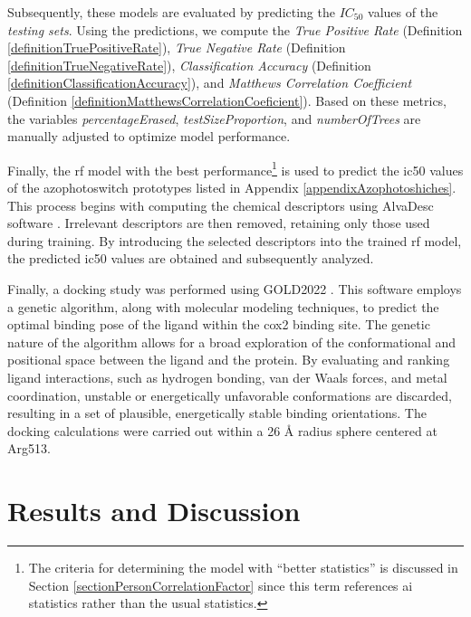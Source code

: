 \documentclass[11pt]{article}
\begin{document}
Subsequently, these models are evaluated by predicting the $IC_{50}$ values of the \emph{testing sets}. Using the predictions, we compute the \emph{True Positive Rate} (Definition \ref{definitionTruePositiveRate}), \emph{True Negative Rate} (Definition \ref{definitionTrueNegativeRate}), \emph{Classification Accuracy} (Definition \ref{definitionClassificationAccuracy}), and \emph{Matthews Correlation Coefficient} (Definition \ref{definitionMatthewsCorrelationCoeficient}). Based on these metrics, the variables \emph{percentageErased}, \emph{testSizeProportion}, and \emph{numberOfTrees} are manually adjusted to optimize model performance.

Finally, the \gls{rf} model with the best performance\footnote{The criteria for determining the model with “better statistics” is discussed in Section \ref{sectionPersonCorrelationFactor} since this term references \gls{ai} statistics rather than the usual statistics.} is used to predict the \gls{ic50} values of the azophotoswitch prototypes listed in Appendix \ref{appendixAzophotoshiches}. This process begins with computing the chemical descriptors using AlvaDesc software \cite{MauriMolecularDescriptorsBook}. Irrelevant descriptors are then removed, retaining only those used during training. By introducing the selected descriptors into the trained \gls{rf} model, the predicted \gls{ic50} values are obtained and subsequently analyzed.

Finally, a docking study was performed using GOLD2022 \cite{GoldReference}. This software employs a genetic algorithm, along with molecular modeling techniques, to predict the optimal binding pose of the ligand within the \gls{cox2} binding site. The genetic nature of the algorithm allows for a broad exploration of the conformational and positional space between the ligand and the protein. By evaluating and ranking ligand interactions, such as hydrogen bonding, van der Waals forces, and metal coordination, unstable or energetically unfavorable conformations are discarded, resulting in a set of plausible, energetically stable binding orientations. The docking calculations were carried out within a 26 Å radius sphere centered at Arg513.


\newpage
\section{Results and Discussion}\label{sectionResultsAndDiscussion}
\end{document}
